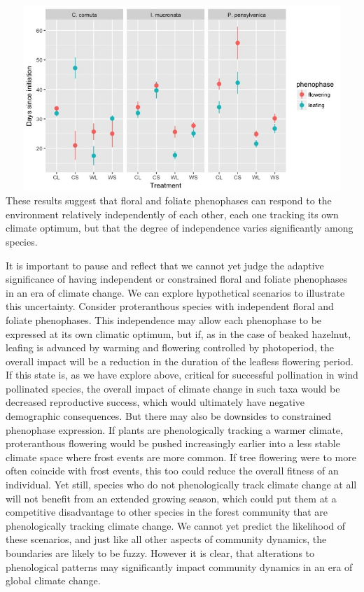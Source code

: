 \documentclass{article}\usepackage[]{graphicx}\usepackage[]{color}
\begin{document}
\includegraphics[width=16cm,height=7cm] {shrubs_4_csee}\\
These results suggest that floral and foliate phenophases can respond to the environment relatively independently of each other, each one tracking its own climate optimum, but that the degree of independence varies significantly among species. 
\par It is important to pause and reflect that we cannot yet judge the adaptive significance of having independent or constrained floral and foliate phenophases in an era of climate change. We can explore hypothetical scenarios to illustrate this uncertainty. Consider proteranthous species with independent floral and foliate phenophases. This independence may allow each phenophase to be expressed at its own climatic optimum, but if, as in the case of beaked hazelnut, leafing is advanced by warming and flowering controlled by photoperiod, the overall impact will be a reduction in the duration of the leafless flowering period. If this state is, as we have explore above, critical for successful pollination in wind pollinated species, the overall impact of climate change in such taxa would be decreased reproductive success, which would ultimately have negative demographic consequences. But there may also be downsides to constrained phenophase expression. If plants are phenologically tracking a warmer climate, proteranthous flowering would be pushed increasingly earlier into a less stable climate space where frost events are more common. If tree flowering were to more often coincide with frost events, this too could reduce the overall fitness of an individual. Yet still, species who do not phenologically track climate change at all will not benefit from an extended growing season, which could put them at a competitive disadvantage to other species in the forest community that are phenologically tracking climate change. We cannot yet predict the likelihood of these scenarios, and just like all other aspects of community dynamics, the boundaries are likely to be fuzzy. However it is clear, that alterations to phenological patterns may significantly impact community dynamics in an era of global climate change.
\end{document}
